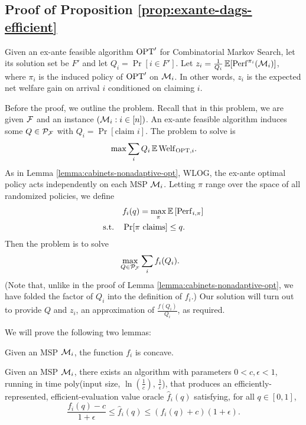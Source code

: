 \subsection{Proof of Proposition \ref{prop:exante-dags-efficient}} \label{subapp:exante-fptas}

Given an ex-ante feasible algorithm $\mathrm{OPT}'$ for Combinatorial Markov Search, let its solution set be $F'$ and let $Q_i = \Pr[i \in F']$.
Let $z_i = \frac{1}{Q_i}\operatorname*{\mathbb{E}}[\mathrm{Perf}^{\pi_i}(\mathcal{M}_i)]$, where $\pi_i$ is the induced policy of $\mathrm{OPT}'$ on $\mathcal{M}_i$.
In other words, $z_i$ is the expected net welfare gain on arrival $i$ conditioned on claiming $i$.

Before the proof, we outline the problem.
Recall that in this problem, we are given $\mathcal{F}$ and an instance $(\mathcal{M}_i : i \in [n])$.
An ex-ante feasible algorithm induces some $Q \in \mathcal{P}_{\mathcal{F}}$ with $Q_i = \Pr[\text{claim $i$}]$.
The problem to solve is
  \[ \max \sum_i Q_i \operatorname*{\mathbb{E}} \mathrm{Welf}_{\mathrm{OPT},i} . \]
As in Lemma \ref{lemma:cabinets-nonadaptive-opt}, WLOG, the ex-ante optimal policy acts independently on each MSP $\mathcal{M}_i$.
Letting $\pi$ range over the space of all randomized policies, we define
\begin{align}
  &f_i(q) = \max_{\pi} \operatorname*{\mathbb{E}} \left[ \mathrm{Perf}_{i,\pi} \right]   \label{eq:exante-dags-f}  \\
  \text{s.t.} \quad
  &\Pr[\text{$\pi$ claims}] \leq q .  \nonumber
\end{align}
Then the problem is to solve
\begin{align}
  &\max_{Q \in \mathcal{P}_{\mathcal{F}}} \sum_i f_i(Q_i) .   \label{eq:exante-dags}
\end{align}
(Note that, unlike in the proof of Lemma \ref{lemma:cabinets-nonadaptive-opt}, we have folded the factor of $Q_i$ into the definition of $f_i$.)
Our solution will turn out to provide $Q$ and $z_i$, an approximation of $\frac{f(Q_i)}{Q_i}$, as required.

We will prove the following two lemmas:
\begin{lemma} \label{lemma:exante-dags-f-concave}
  Given an MSP $\mathcal{M}_i$, the function $f_i$ is concave.
\end{lemma}
\begin{lemma} \label{lemma:exante-dags-f-fptas}
  Given an MSP $\mathcal{M}_i$, there exists an algorithm with parameters $0 < c,\epsilon < 1$, running in time poly(input size, $\ln(\tfrac{1}{c})$, $\tfrac{1}{\epsilon}$), that produces an efficiently-represented, efficient-evaluation value oracle $\hat{f}_i(q)$ satisfying, for all $q \in [0,1]$,
  \[ \frac{f_i(q) - c}{1+\epsilon} \leq \hat{f}_{i}(q) \leq (f_i(q) + c)(1+\epsilon) . \]
\end{lemma}

